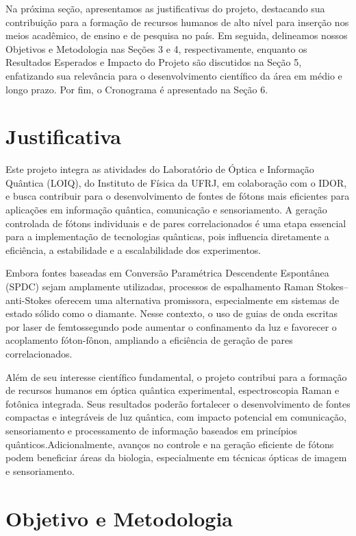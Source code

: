 \documentclass[brazil,12pt,a4paper,openany]{article}
\begin{document}
Na próxima seção, apresentamos as justificativas do projeto, destacando sua contribuição para a formação de recursos humanos de alto nível para inserção nos meios acadêmico, de ensino e de pesquisa no país. Em seguida, delineamos nossos Objetivos e Metodologia nas Seções 3 e 4, respectivamente, enquanto os Resultados Esperados e Impacto do Projeto são discutidos na Seção 5, enfatizando sua relevância para o desenvolvimento científico da área em médio e longo prazo. Por fim, o Cronograma é apresentado na Seção 6.

\section{Justificativa}

Este projeto integra as atividades do Laboratório de Óptica e Informação Quântica (LOIQ), do Instituto de Física da UFRJ, em colaboração com o IDOR, e busca contribuir para o desenvolvimento de fontes de fótons mais eficientes para aplicações em informação quântica, comunicação e sensoriamento. A geração controlada de fótons individuais e de pares correlacionados é uma etapa essencial para a implementação de tecnologias quânticas, pois influencia diretamente a eficiência, a estabilidade e a escalabilidade dos experimentos.

Embora fontes baseadas em Conversão Paramétrica Descendente Espontânea (SPDC) sejam amplamente utilizadas, processos de espalhamento Raman Stokes--anti-Stokes oferecem uma alternativa promissora, especialmente em sistemas de estado sólido como o diamante. Nesse contexto, o uso de guias de onda escritas por laser de femtossegundo pode aumentar o confinamento da luz e favorecer o acoplamento fóton-fônon, ampliando a eficiência de geração de pares correlacionados.

Além de seu interesse científico fundamental, o projeto contribui para a formação de recursos humanos em óptica quântica experimental,
 espectroscopia Raman e fotônica integrada. Seus resultados poderão fortalecer o desenvolvimento de fontes compactas e integráveis de luz quântica,
  com impacto potencial em comunicação, sensoriamento e processamento de informação baseados em princípios quânticos.Adicionalmente, avanços no controle e na geração eficiente de fótons podem beneficiar áreas da biologia, especialmente em técnicas ópticas de imagem e sensoriamento.



\section{Objetivo e Metodologia}
\end{document}
